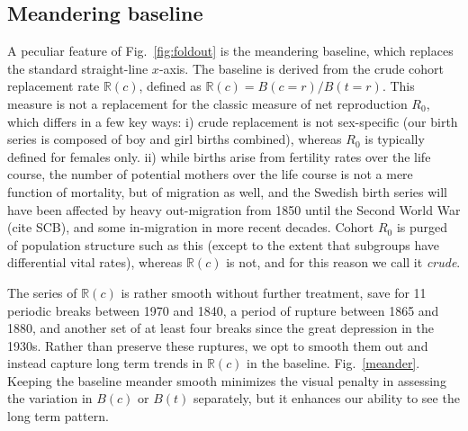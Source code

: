 \documentclass{article}
\begin{document}
\subsection{Meandering baseline}
A peculiar feature of Fig.~\ref{fig:foldout} is the meandering baseline, which replaces the standard straight-line $x$-axis. The baseline is derived from the crude cohort replacement rate $\mathbb{R}(c)$, defined as $\mathbb{R}(c) = B(c=r) / B(t=r)$. This measure is not a replacement for the classic measure of net reproduction $R_0$, which differs in a few key ways: i) crude replacement is not sex-specific (our birth series is composed of boy and girl births combined), whereas $R_0$ is typically defined for females only. ii) while births arise from fertility rates over the life course, the number of potential mothers over the life course is not a mere function of mortality, but of migration as well, and the Swedish birth series will have been affected by heavy out-migration from 1850 until the Second World War (cite SCB), and some in-migration in more recent decades. Cohort $R_0$ is purged of population structure such as this (except to the extent that subgroups have differential vital rates), whereas $\mathbb{R}(c)$ is not, and for this reason we call it \emph{crude}.

The series of $\mathbb{R}(c)$ is rather smooth without further treatment, save for 11 periodic breaks between 1970 and 1840, a period of rupture between 1865 and 1880, and another set of at least four breaks since the great depression in the 1930s. Rather than preserve these ruptures, we opt to smooth them out and instead capture long term trends in $\mathbb{R}(c)$ in the baseline. Fig.~\ref{meander}. Keeping the baseline meander smooth minimizes the visual penalty in assessing the variation in $B(c)$ or $B(t)$ separately, but it enhances our ability to see the long term pattern.
\end{document}
